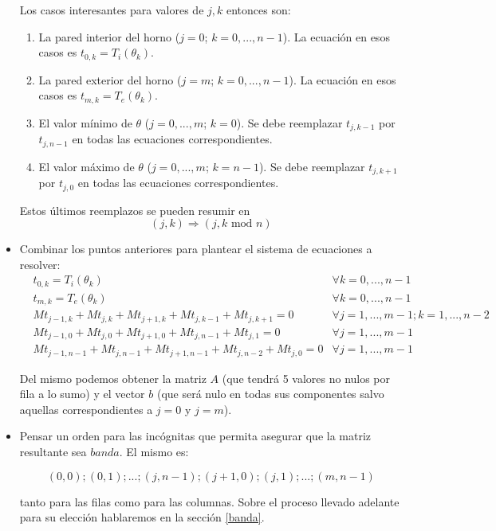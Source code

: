 \begin{itemize}
    Los casos interesantes para valores de $j, k$ entonces son:
    \begin{enumerate}
     \item La pared interior del horno ($j = 0$; $k = 0, ..., n-1$). La ecuación en esos casos es $t_{0, k} = T_i(\theta_k)$.
     \item La pared exterior del horno ($j = m$; $k = 0, ..., n-1$). La ecuación en esos casos es $t_{m, k} = T_e(\theta_k)$.
     \item El valor mínimo de $\theta$ ($j = 0, ..., m$; $k = 0$). Se debe reemplazar $t_{j, k-1}$ por $t_{j, n-1}$ en todas las ecuaciones correspondientes.
     \item El valor máximo de $\theta$ ($j = 0, ..., m$; $k = n-1$). Se debe reemplazar $t_{j, k+1}$ por $t_{j, 0}$ en todas las ecuaciones correspondientes.
    \end{enumerate}
    Estos últimos reemplazos se pueden resumir en $$(j, k) \Rightarrow (j, k \text{ mod } n)$$
 \item
    Combinar los puntos anteriores para plantear el sistema de ecuaciones a resolver:
    \begin{align*}\label{sistema}
    &t_{0, k} = T_i(\theta_k)                                           &\forall k = 0, ..., n-1  \\
    &t_{m, k} = T_e(\theta_k)                                           &\forall k = 0, ..., n-1  \\
    &Mt_{j-1,k} + Mt_{j,k} + Mt_{j+1,k} + Mt_{j,k-1} + Mt_{j,k+1} = 0  &\forall j=1, ..., m-1; k = 1, ... , n-2 \\
    &Mt_{j-1,0} + Mt_{j,0} + Mt_{j+1,0} + Mt_{j,n-1} + Mt_{j,1} = 0    &\forall j=1, ..., m-1 \\
    &Mt_{j-1,n-1} + Mt_{j,n-1} + Mt_{j+1,n-1} + Mt_{j,n-2} + Mt_{j,0} = 0    &\forall j=1, ..., m-1
    \end{align*}

    Del mismo podemos obtener la matriz $A$ (que tendrá 5 valores no nulos por fila a lo sumo) y el vector $b$ (que será nulo en todas sus componentes salvo aquellas correspondientes a $j=0$ y $j=m$).
  \item
    Pensar un orden para las incógnitas que permita asegurar que la matriz resultante sea $banda$. El mismo es:
    
    $$ (0,0); (0,1); ... ; (j,n-1); (j+1,0); (j,1); ... ; (m, n-1)$$ %
    
    tanto para las filas como para las columnas. Sobre el proceso llevado adelante para su elección hablaremos en la sección \ref{banda}.
\end{itemize}

